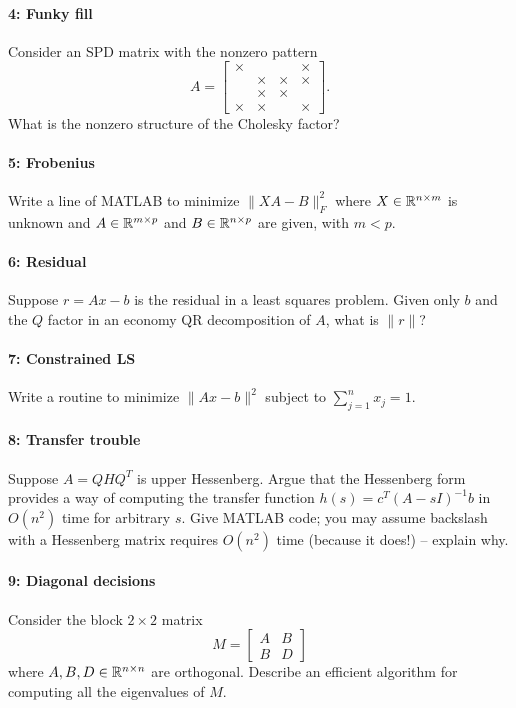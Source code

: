 \documentclass[12pt, leqno]{article}
\begin{document}
\paragraph{4: Funky fill}
Consider an SPD matrix with the nonzero pattern
\[
A =
\begin{bmatrix}
  \times &        &        & \times \\
         & \times & \times & \times \\
         & \times & \times &        \\
  \times & \times &        & \times
\end{bmatrix}.
\]
What is the nonzero structure of the Cholesky factor?

\paragraph{5: Frobenius}
Write a line of MATLAB to minimize $\|XA-B\|_F^2$
where $X \in \mathbb{R}^{n \times m}$ is unknown and
$A \in \mathbb{R}^{m \times p}$ and $B \in \mathbb{R}^{n \times p}$
are given, with $m < p$.

\paragraph{6: Residual}
Suppose $r = Ax-b$ is the residual in a least squares problem.
Given only $b$ and the $Q$ factor in an economy QR decomposition
of $A$, what is $\|r\|$?

\paragraph{7: Constrained LS}
Write a routine to minimize $\|Ax-b\|^2$ subject to
$\sum_{j=1}^n x_j = 1$.

\paragraph{8: Transfer trouble}
Suppose $A = Q H Q^T$ is upper Hessenberg.  Argue that
the Hessenberg form provides a way of computing the transfer
function $h(s) = c^T (A-sI)^{-1} b$ in $O(n^2)$ time for arbitrary
$s$.  Give MATLAB code; you may assume backslash with a Hessenberg
matrix requires $O(n^2)$ time (because it does!) -- explain why.

\paragraph{9: Diagonal decisions}
Consider the block $2 \times 2$ matrix
\[
  M = \begin{bmatrix} A & B \\ B & D \end{bmatrix}
\]
where $A, B, D \in \mathbb{R}^{n \times n}$ are orthogonal.
Describe an efficient algorithm for computing
all the eigenvalues of $M$.
\end{document}
